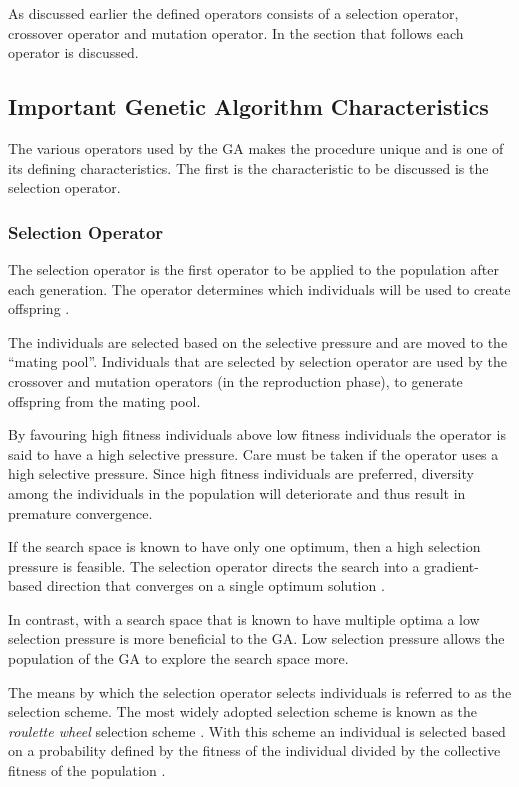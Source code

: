 As discussed earlier the defined operators consists of a selection operator, crossover operator and mutation operator\cite{SelfAdaptiveGA,MultiPopGA}. In the section that follows each operator is discussed.

\subsection{Important Genetic Algorithm Characteristics}
The various operators used by the \gls{GA} makes the procedure unique and is one of its defining characteristics. The first is the characteristic to be discussed is the selection operator.

\subsubsection{Selection Operator}
The selection operator is the first operator to be applied to the population after each generation. The operator determines which individuals will be used to create offspring \cite{CoactiveFuzzyGA,CombinedBranchBoundGA,ConstrainedGA}.

The individuals are selected based on the selective pressure and are moved to the ``mating pool''. Individuals that are selected by selection operator are used by the crossover and mutation operators (in the reproduction phase), to generate offspring from the mating pool\cite{AdaptiveSAGA,AcceleratingGA}.

By favouring high fitness individuals above low fitness individuals the operator is said to have a high selective pressure\cite{CompuIntelligenceIntro}. Care must be taken if the operator uses a high selective pressure. Since high fitness individuals are preferred, diversity among the individuals in the population will deteriorate and thus result in premature convergence\cite{ConstrainedGA, CompuIntelligenceIntro}.

If the search space is known to have only one optimum, then a high selection pressure is feasible\cite{ConstrainedGA}. The selection operator directs the search into a gradient-based direction that converges on a single optimum solution \cite{ConstrainedGA}. 

In contrast, with a search space that is known to have multiple optima a low selection pressure is more beneficial to the \gls{GA}\cite{ConstrainedGA}. Low selection pressure allows the population of the \gls{GA} to explore the search space more\cite{ConstrainedGA}.

The means by which the selection operator selects individuals is referred to as the selection scheme. The most widely adopted selection scheme is known as the \emph{roulette wheel} selection scheme \cite{ConstrainedGA,GeostatisticalGA,HybridBaldwinGA,CoactiveFuzzyGA}. With this scheme an individual is selected based on a probability defined by the fitness of the individual divided by the collective fitness of the population \cite{GeostatisticalGA}.

